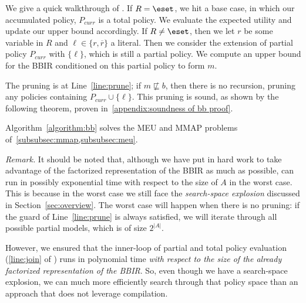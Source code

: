 We give a quick walkthrough of . If $R = \eset$,
we hit a base case, in which our accumulated policy, $P_{curr}$ is
a total policy. We evaluate the expected utility and update our upper bound
accordingly. If $R \neq \eset$, then we let $r$ be some variable in $R$ and
$\ell \in \{r, \overline r\}$ a literal.
Then we consider the extension of partial policy $P_{curr}$ with $\{\ell\}$,
which is still a partial policy. We compute an upper bound for the BBIR
conditioned on this partial policy to form $m$.

The pruning is at Line~\ref{line:prune}; if $m \not\sqsubseteq b$, then
there is no recursion, pruning any policies containing
$P_{curr} \cup \{\ell\}$. This pruning is sound, as shown by the
following theorem, proven in~\cref{appendix:soundness of bb proof}.

\begin{theorem}\label{thm:soundness of bb}
  Algorithm~\ref{algorithm:bb}
  solves the MEU and MMAP problems of~\cref{subsubsec:mmap,subsubsec:meu}.
\end{theorem}

\textit{Remark.}
It should be noted that, although we have put in hard work to take advantage of
the factorized representation of the BBIR as much as possible,
 can run in possibly exponential time with respect
to the size of $A$ in the worst case. This is because in the worst case we still
face the \textit{search-space explosion} discussed in
Section~\ref{sec:overview}.  The worst case will happen when there is no
pruning: if the guard of Line~\ref{line:prune} is always satisfied, we will
iterate through all possible partial models, which is of size $2^{|A|}$.

However,
we ensured that the inner-loop of partial and total policy evaluation (\cref{line:join}
of ) runs in polynomial time \textit{with respect
to the size of the already factorized representation of the BBIR}.
So, even though we have a search-space explosion,
we can much more efficiently search through that policy space than an approach
that does not leverage compilation.


